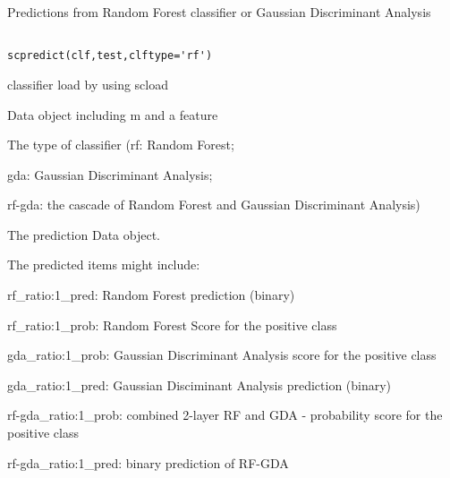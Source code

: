 \documentclass[a4paper]{book}
\begin{document}
%
\begin{Description}\relax
Predictions from Random Forest classifier or Gaussian Discriminant Analysis

\end{Description}
%
\begin{Usage}
\begin{verbatim}

scpredict(clf,test,clftype='rf')

\end{verbatim}
\end{Usage}
%
\begin{Arguments}
\begin{ldescription}
\item[\code{clf}] classifier load by using scload
\item[\code{test}] Data object including m and a feature
\item[\code{clftype}] The type of classifier 
(rf: Random Forest; 

gda: Gaussian Discriminant Analysis; 

rf-gda: the cascade of Random Forest and Gaussian Discriminant Analysis)

\end{ldescription}
\end{Arguments}
%
\begin{Value}
The prediction Data object.  

The predicted items might include:

rf\_ratio:1\_pred: Random Forest prediction (binary) 

rf\_ratio:1\_prob: Random Forest Score for the positive class

gda\_ratio:1\_prob: Gaussian Discriminant Analysis score for the positive class 

gda\_ratio:1\_pred: Gaussian Disciminant Analysis prediction (binary)

rf-gda\_ratio:1\_prob: combined 2-layer RF and GDA - probability score for the positive class

rf-gda\_ratio:1\_pred: binary prediction of RF-GDA 

\end{Value}
%
\end{document}
